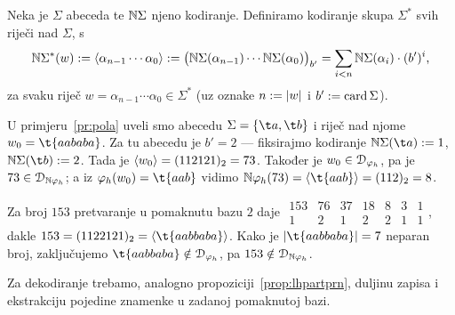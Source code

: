 \begin{definicija}[{name=[kodiranje riječi]}]
Neka je $\Sigma$ abeceda te ${\mathbb N}\Sigma$ njeno kodiranje. Definiramo kodiranje skupa $\Sigma^*$ svih riječi nad $\Sigma$, s
\begin{equation}\label{eq:kodNSz}
    {\mathbb N}\Sigma^*(w):=\langle\alpha_{n-1}\dotsm\alpha_0\rangle:=\bigl({\mathbb N}\Sigma(\alpha_{n-1})\dotsm{\mathbb N}\Sigma(\alpha_0)\bigr)_{b'}=\sum_{i<n}{\mathbb N}\Sigma(\alpha_i)\cdot(b')^i\text,
\end{equation}
za svaku riječ $w=\alpha_{n-1}\dotsm\alpha_0\in\Sigma^*$ (uz oznake $n:=\lvert w\rvert$ i $b':=\operatorname{card}\Sigma$).
\end{definicija}

\begin{primjer}[{name=[prateća funkcija jezične funkcije]}]
U primjeru~\ref{pr:pola} uveli smo abecedu $\Sigma=\{\t a,\t b\}$ i riječ nad njome $w_0=\t{aababa}$. Za tu abecedu je $b'=2$ --- fiksirajmo kodiranje $\N\Sigma(\t a):=1$, $\N\Sigma(\t b):=2$. Tada je $\langle w_0\rangle=(112121)_2=73$.
Također je $w_0\in\mathcal D_{\varphi_h}$, pa je $73\in\mathcal D_{{\mathbb N}\varphi_h}$; a iz $\varphi_h(w_0)=\t{aab}$ vidimo $\N\varphi_h(73)=\kr{\t{aab}}=(112)_2=8$.

Za broj $153$ pretvaranje u pomaknutu bazu $2$ daje
$\begin{array}{rrrrrrr}
153 & 76 & 37 & 18 & 8 & 3 & 1\\\hline
1 & 2 & 1 & 2 & 2 & 1 & 1
\end{array}$, dakle $153=(1122121)_2=\kr{\t{aabbaba}}$. Kako je $\dulj{\t{aabbaba}}=7$ neparan broj, zaključujemo $\t{aabbaba}\notin\dom{\varphi_h}$, pa $153\notin\mathcal D_{{\mathbb N}\varphi_h}$.
\end{primjer}

Za dekodiranje trebamo, analogno propoziciji~\ref{prop:lhpartprn}, duljinu zapisa i ekstrakciju pojedine znamenke u zadanoj pomaknutoj bazi. %

